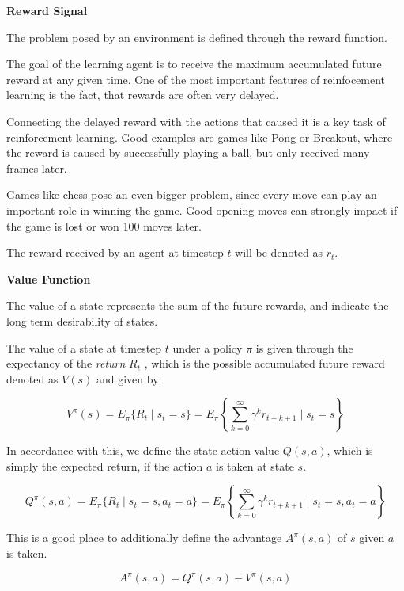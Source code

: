 \textbf{Reward Signal}

The problem posed by an environment is defined through the reward function. 

The goal of the learning agent is to receive the maximum accumulated future reward at any given time. One of the most important features of reinfocement learning is the fact, that rewards are often very delayed. 

Connecting the delayed reward with the actions that caused it is a key task of reinforcement learning.
Good examples are games like Pong or Breakout, where the reward is caused by successfully playing a ball, but only received many frames later.

Games like chess pose an even bigger problem, since every move can play an important role in winning the game. Good opening moves can strongly impact if the game is lost or won 100 moves later.

The reward received by an agent at timestep $t$ will be denoted as $r_t$.

\textbf{Value Function}

The value of a state represents the sum of the future rewards, and indicate the long term desirability of states.

The value of a state at timestep $t$ under a policy $\pi$ is given through the expectancy of the \textit{return} $R_t$ , which is the possible accumulated future reward denoted as $V(s)$ and given by:

\begin{equation}
{
V^\pi (s) = E_\pi \{R_t \mid s_t = s\} = E_\pi \left\{ \sum_{k=0}^\infty \gamma^k r_{t+k+1} \mid s_t = s \right\}
}
\end{equation}

In accordance with this, we define the state-action value $Q(s,a)$, which is simply the expected return, if the action $a$ is taken at state $s$.

\begin{equation}
{
Q^\pi (s,a) = E_\pi \{R_t \mid s_t = s, a_t = a\} = E_\pi \left\{ \sum_{k=0}^\infty \gamma^k r_{t+k+1} \mid s_t = s, a_t = a \right\}
}
\end{equation}

This is a good place to additionally define the advantage $A^\pi(s,a)$ of  $s$ given $a$ is taken.

\begin{equation}
A^\pi(s,a) = Q^\pi(s,a)-V^\pi(s,a)
\label{adv}
\end{equation}

